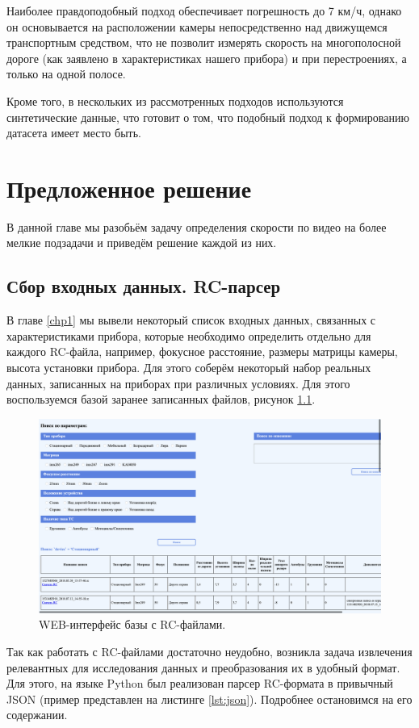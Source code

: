 \documentclass[specification,annotation,times]{itmo-student-thesis}
\begin{document}
Наиболее правдоподобный подход обеспечивает погрешность до 7 км/ч, однако он основывается на расположении камеры непосредственно над движущемся транспортным средством, что не позволит измерять скорость на многополосной дороге (как заявлено в характеристиках нашего прибора) и при перестроениях, а только на одной полосе.

Кроме того, в нескольких из рассмотренных подходов используются синтетические данные, что готовит о том, что подобный подход к формированию датасета имеет место быть.

\chapter{Предложенное решение}
В данной главе мы разобьём задачу определения скорости по видео на более мелкие подзадачи и  приведём решение каждой из них.

\section{Сбор входных данных. RC-парсер} \label{sec:data}
В главе \ref{chp1} мы вывели некоторый список входных данных, связанных с характеристиками прибора, которые необходимо определить отдельно для каждого RC-файла, например, фокусное расстояние, размеры матрицы камеры, высота установки прибора. Для этого соберём некоторый набор реальных данных, записанных на приборах при различных условиях. Для этого воспользуемся базой заранее записанных файлов, рисунок \ref{img:web-rc}.

\begin{figure}[!ht]
	\caption{WEB-интерфейс базы с RC-файлами.}\label{img:web-rc}
	\includegraphics[width=0.85\linewidth]{../png/web_rc.png}
	\centering
\end{figure}

Так как работать с  RC-файлами достаточно неудобно, возникла задача извлечения релевантных для исследования данных и преобразования их в удобный формат. Для этого, на языке Python был реализован парсер RC-формата в привычный JSON (пример представлен на листинге \ref{lst:json}). Подробнее остановимся на его содержании.
\end{document}
